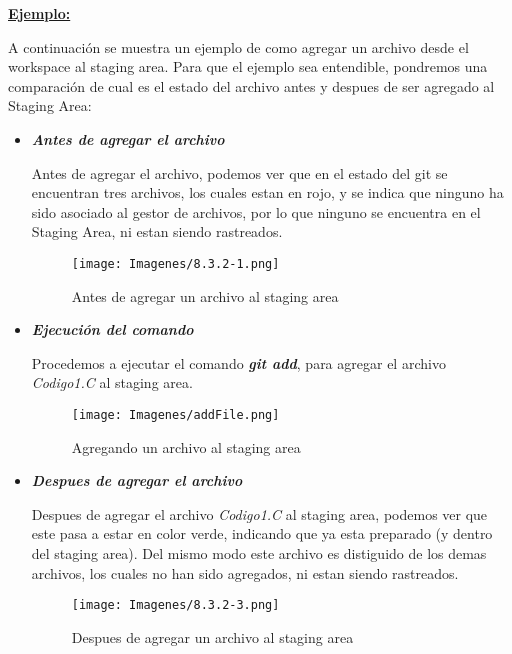 \textbf{\underline{Ejemplo:}}

A continuación se muestra un ejemplo de como agregar un archivo desde el workspace al staging area. Para que el ejemplo sea entendible, pondremos una comparación de cual es el estado del archivo antes y despues de ser agregado al Staging Area:

\begin{itemize}
    \item \textbf{\textit{Antes de agregar el archivo}}

    Antes de agregar el archivo, podemos ver que en el estado del git se encuentran tres archivos, los cuales estan en rojo, y se indica que ninguno ha sido asociado al gestor de archivos, por lo que ninguno se encuentra en el Staging Area, ni estan siendo rastreados.
    
        \begin{figure}[H]
            \centering
            \texttt{[image: Imagenes/8.3.2-1.png]}
            \caption{Antes de agregar un archivo al staging area}
            \label{}
        \end{figure}
    
    \item \textbf{\textit{Ejecución del comando}}

    Procedemos a ejecutar el comando \textbf{\textit{git add}}, para agregar el archivo \textit{Codigo1.C} al staging area.
    
        \begin{figure}[H]
            \centering
            \texttt{[image: Imagenes/addFile.png]}
            \caption{Agregando un archivo al staging area}
            \label{}
        \end{figure}
    
    \item \textbf{\textit{Despues de agregar el archivo}}

    Despues de agregar el archivo \textit{Codigo1.C} al staging area, podemos ver que este pasa a estar en color verde, indicando que ya esta preparado (y dentro del staging area). Del mismo modo este archivo es distiguido de los demas archivos, los cuales no han sido agregados, ni estan siendo rastreados.
    
        \begin{figure}[H]
            \centering
            \texttt{[image: Imagenes/8.3.2-3.png]}
            \caption{Despues de agregar un archivo al staging area}
            \label{}
        \end{figure}
    
\end{itemize}

